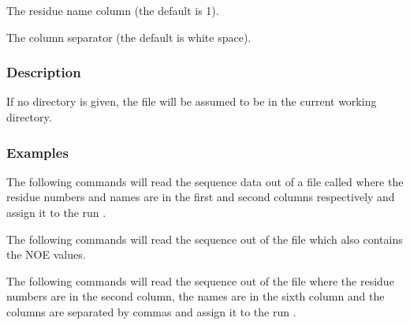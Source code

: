    The residue name column (the default is 1).   

   The column separator (the default is white space).  

  

  
 \subsubsection{Description} 

 If no directory is given, the file will be assumed to be in the current working directory. 
  

  
 \subsubsection{Examples} 

 The following commands will read the sequence data out of a file called  where the residue numbers and names are in the first and second columns respectively and assign it to the run . 
  




 The following commands will read the sequence out of the file  which also contains the NOE values. 
  




 The following commands will read the sequence out of the file  where the residue numbers are in the second column, the names are in the sixth column and the columns are separated by commas and assign it to the run . 
  



